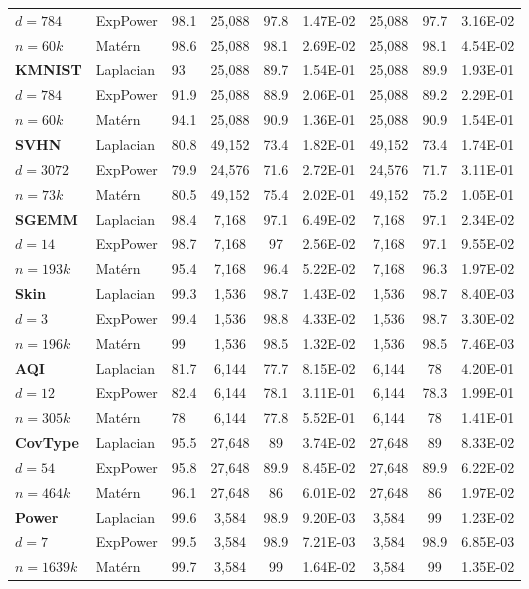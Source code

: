 \documentclass{article}
\def\matern{Mat\'ern\,}
\theoremstyle{plain}
\begin{document}
\begin{table}[!htb]
\begin{tabular}{lllcccccc}
        $d=784$ & ExpPower & 98.1 &  25,088  & 97.8 & 1.47E-02 &  25,088  & 97.7 & 3.16E-02 \\ 
        $n=60k$ & \matern & 98.6 &  25,088  & 98.1 & 2.69E-02 &  25,088  & 98.1 & 4.54E-02 \\ \midrule
        \textbf{KMNIST} & Laplacian & 93 &  25,088  & 89.7 & 1.54E-01 &  25,088  & 89.9 & 1.93E-01 \\ 
        $d=784$ & ExpPower & 91.9 &  25,088  & 88.9 & 2.06E-01 &  25,088  & 89.2 & 2.29E-01 \\ 
        $n=60k$ & \matern & 94.1 &  25,088  & 90.9 & 1.36E-01 &  25,088  & 90.9 & 1.54E-01 \\ \midrule
        \textbf{SVHN} & Laplacian & 80.8 &  49,152  & 73.4 & 1.82E-01 &  49,152  & 73.4 & 1.74E-01 \\ 
        $d=3072$ & ExpPower & 79.9 &  24,576  & 71.6 & 2.72E-01 &  24,576  & 71.7 & 3.11E-01 \\ 
        $n=73k$ & \matern & 80.5 &  49,152  & 75.4 & 2.02E-01 &  49,152  & 75.2 & 1.05E-01 \\ \midrule
        \textbf{SGEMM} & Laplacian & 98.4 &  7,168  & 97.1 & 6.49E-02 &  7,168  & 97.1 & 2.34E-02 \\ 
        $d=14$ & ExpPower & 98.7 &  7,168  & 97 & 2.56E-02 &  7,168  & 97.1 & 9.55E-02 \\ 
        $n=193k$ & \matern & 95.4 &  7,168  & 96.4 & 5.22E-02 &  7,168  & 96.3 & 1.97E-02 \\ \midrule
        \textbf{Skin} & Laplacian & 99.3 &  1,536  & 98.7 & 1.43E-02 &  1,536  & 98.7 & 8.40E-03 \\ 
        $d=3$ & ExpPower & 99.4 &  1,536  & 98.8 & 4.33E-02 &  1,536  & 98.7 & 3.30E-02 \\ 
        $n=196k$ & \matern & 99 &  1,536  & 98.5 & 1.32E-02 &  1,536  & 98.5 & 7.46E-03 \\ \midrule
        \textbf{AQI} & Laplacian & 81.7 &  6,144  & 77.7 & 8.15E-02 &  6,144  & 78 & 4.20E-01 \\ 
        $d=12$ & ExpPower & 82.4 &  6,144  & 78.1 & 3.11E-01 &  6,144  & 78.3 & 1.99E-01 \\ 
        $n=305k$ & \matern & 78 &  6,144  & 77.8 & 5.52E-01 &  6,144  & 78 & 1.41E-01 \\ \midrule
        \textbf{CovType} & Laplacian & 95.5 &  27,648  & 89 & 3.74E-02 &  27,648  & 89 & 8.33E-02 \\ 
        $d=54$ & ExpPower & 95.8 &  27,648  & 89.9 & 8.45E-02 &  27,648  & 89.9 & 6.22E-02 \\ 
        $n=464k$ & \matern & 96.1 &  27,648  & 86 & 6.01E-02 &  27,648  & 86 & 1.97E-02 \\ \midrule
        \textbf{Power} & Laplacian & 99.6 &  3,584  & 98.9 & 9.20E-03 &  3,584  & 99 & 1.23E-02 \\ 
        $d=7$ & ExpPower & 99.5 &  3,584  & 98.9 & 7.21E-03 &  3,584  & 98.9 & 6.85E-03 \\ 
        $n=1639k$ & \matern & 99.7 &  3,584  & 99 & 1.64E-02 &  3,584  & 99 & 1.35E-02 \\ 
    \bottomrule
    \end{tabular}
\end{table}
\end{document}
